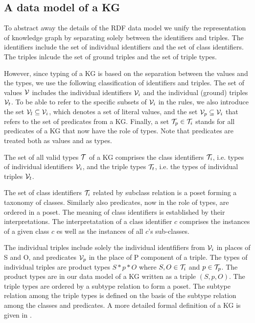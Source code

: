 \documentclass[runningheads]{llncs}
\newcommand{\I}{{\cal I}}
\newcommand{\V}{{\cal V}}
\newcommand{\T}{{\cal T}}
\begin{document}
\subsection{A data model of a KG}

To abstract away the details of the RDF data model we unify the
representation of knowledge graph by separating solely between the
identifiers and triples. The identifiers include the set of individual
identifiers and the set of class identifiers. The triples inlcude the
set of ground triples and the set of triple types.


However, since typing of a KG is based on the separation between the
values and the types, we use the following classification of
identifiers and triples. The set of values $\V$ includes the
individual identifiers $\V_i$ and the individual (ground) triples
$\V_t$. To be able to refer to the specific subsets of $\V_i$ in the
rules, we also introduce the set $\V_l\subseteq\V_i$, which denotes a
set of literal values, and the set $\V_p\subseteq\V_i$ that refers to
the set of predicates from a KG. Finally, a set $\T_p\in\T_i$ stands
for all predicates of a KG that now have the role of types. Note that
predicates are treated both as values and as types.

The set of all valid types $\T$ of a KG comprises the class
identifiers $\T_i$, i.e. types of individual identifiers $\V_i$, and
the triple types $\T_t$, i.e. the types of individual triples $\V_t$.

The set of class identifiers $\T_i$ related by subclass relation is a
poset forming a taxonomy of classes. Similarly also predicates, now
in the role of types, are ordered in a poset. The meaning of class
identifiers is established by their interpretations. The
interpretatation of a class identifier $c$ comprises the instances of
a given class $c$ es well as the instances of all $c$'s sub-classes. 

The individual triples include solely the individual identfifiers from
$\V_i$ in places of S and O, and predicates $\V_p$ in the place of P
component of a triple. The types of individual triples are product
types $S*p*O$ where $S,O\in\T_i$ and $p\in\T_p$. The product types are
in our data model of a KG written as a triple $(S,p,O)$. The triple
types are ordered by a subtype relation to form a poset. The subtype
relation among the triple types is defined on the basis of the subtype
relation among the classes and predicates. A more detailed formal
definition of a KG is given in \cite{Savnik2025}.
\end{document}
